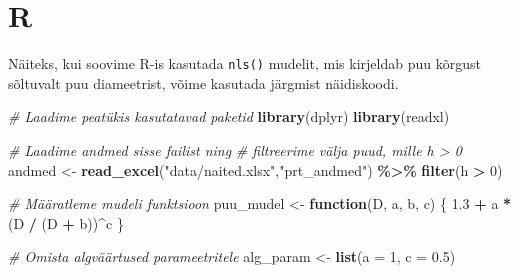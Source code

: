 \documentclass[
]{book}
\newenvironment{Shaded}{\begin{snugshade}}{\end{snugshade}}
\newcommand{\AttributeTok}[1]{\textcolor[rgb]{0.13,0.29,0.53}{#1}}
\newcommand{\CommentTok}[1]{\textcolor[rgb]{0.56,0.35,0.01}{\textit{#1}}}
\newcommand{\ControlFlowTok}[1]{\textcolor[rgb]{0.13,0.29,0.53}{\textbf{#1}}}
\newcommand{\DecValTok}[1]{\textcolor[rgb]{0.00,0.00,0.81}{#1}}
\newcommand{\FloatTok}[1]{\textcolor[rgb]{0.00,0.00,0.81}{#1}}
\newcommand{\FunctionTok}[1]{\textcolor[rgb]{0.13,0.29,0.53}{\textbf{#1}}}
\newcommand{\NormalTok}[1]{#1}
\newcommand{\OtherTok}[1]{\textcolor[rgb]{0.56,0.35,0.01}{#1}}
\newcommand{\SpecialCharTok}[1]{\textcolor[rgb]{0.81,0.36,0.00}{\textbf{#1}}}
\newcommand{\StringTok}[1]{\textcolor[rgb]{0.31,0.60,0.02}{#1}}
\renewenvironment{Shaded} {\begin{snugshade}\footnotesize} {\end{snugshade}}
\begin{document}
\section{R}\label{r}

Näiteks, kui soovime R-is kasutada \texttt{nls()} mudelit, mis kirjeldab puu kõrgust sõltuvalt puu diameetrist, võime kasutada järgmist näidiskoodi.

\begin{Shaded}
\begin{Highlighting}[]
\CommentTok{\# Laadime peatükis kasutatavad paketid}
\FunctionTok{library}\NormalTok{(dplyr)}
\FunctionTok{library}\NormalTok{(readxl)}
\end{Highlighting}
\end{Shaded}

\begin{Shaded}
\begin{Highlighting}[]
\CommentTok{\# Laadime andmed sisse failist ning}
\CommentTok{\# filtreerime välja puud, mille h \textgreater{} 0}
\NormalTok{andmed }\OtherTok{\textless{}{-}} \FunctionTok{read\_excel}\NormalTok{(}\StringTok{"data/naited.xlsx"}\NormalTok{,}\StringTok{"prt\_andmed"}\NormalTok{) }\SpecialCharTok{\%\textgreater{}\%} \FunctionTok{filter}\NormalTok{(h }\SpecialCharTok{\textgreater{}} \DecValTok{0}\NormalTok{)}
\end{Highlighting}
\end{Shaded}

\begin{Shaded}
\begin{Highlighting}[]
\CommentTok{\# Määratleme mudeli funktsioon}
\NormalTok{puu\_mudel }\OtherTok{\textless{}{-}} \ControlFlowTok{function}\NormalTok{(D, a, b, c) \{}
 \FloatTok{1.3} \SpecialCharTok{+}\NormalTok{ a }\SpecialCharTok{*}\NormalTok{ (D }\SpecialCharTok{/}\NormalTok{ (D }\SpecialCharTok{+}\NormalTok{ b))}\SpecialCharTok{\^{}}\NormalTok{c}
\NormalTok{\}}
\end{Highlighting}
\end{Shaded}

\begin{Shaded}
\begin{Highlighting}[]
\CommentTok{\# Omista algväärtused parameetritele}
\NormalTok{alg\_param }\OtherTok{\textless{}{-}} \FunctionTok{list}\NormalTok{(}\AttributeTok{a =} \DecValTok{1}\NormalTok{, }\AttributeTok{c =} \FloatTok{0.5}\NormalTok{)}
\end{Highlighting}
\end{Shaded}
\end{document}
